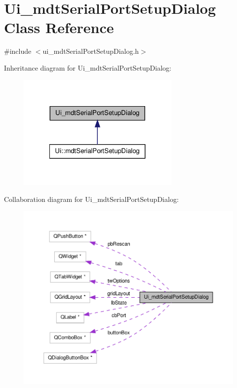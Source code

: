 \hypertarget{class_ui__mdt_serial_port_setup_dialog}{\section{Ui\-\_\-mdt\-Serial\-Port\-Setup\-Dialog Class Reference}
\label{class_ui__mdt_serial_port_setup_dialog}
}


{\ttfamily \#include $<$ui\-\_\-mdt\-Serial\-Port\-Setup\-Dialog.\-h$>$}



Inheritance diagram for Ui\-\_\-mdt\-Serial\-Port\-Setup\-Dialog\-:
\nopagebreak
\begin{figure}[H]
\begin{center}
\leavevmode
\includegraphics[width=224pt]{class_ui__mdt_serial_port_setup_dialog__inherit__graph}
\end{center}
\end{figure}


Collaboration diagram for Ui\-\_\-mdt\-Serial\-Port\-Setup\-Dialog\-:
\nopagebreak
\begin{figure}[H]
\begin{center}
\leavevmode
\includegraphics[width=350pt]{class_ui__mdt_serial_port_setup_dialog__coll__graph}
\end{center}
\end{figure}
